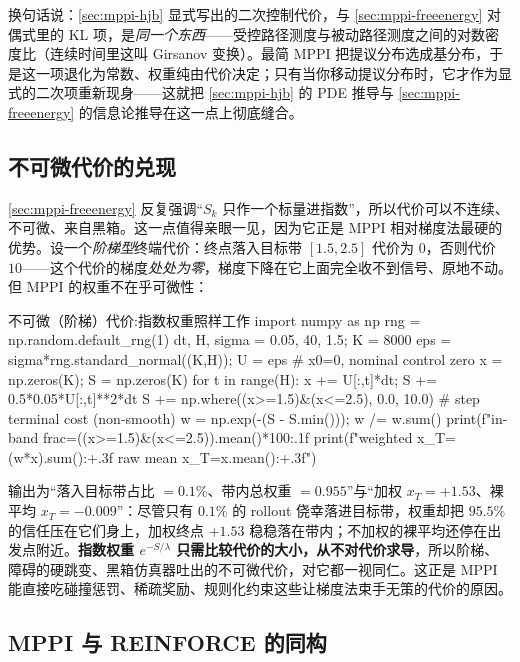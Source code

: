 \noindent 换句话说：\cref{sec:mppi-hjb} 显式写出的二次控制代价，与 \cref{sec:mppi-freeenergy} 对偶式里的 KL 项，是\emph{同一个东西}——受控路径测度与被动路径测度之间的对数密度比（连续时间里这叫 Girsanov 变换）。最简 MPPI 把提议分布选成基分布，于是这一项退化为常数、权重纯由代价决定；只有当你移动提议分布时，它才作为显式的二次项重新现身——这就把 \cref{sec:mppi-hjb} 的 PDE 推导与 \cref{sec:mppi-freeenergy} 的信息论推导在这一点上彻底缝合。

\subsection{不可微代价的兑现}
\label{sec:mppi-nondiff}

\cref{sec:mppi-freeenergy} 反复强调“$S_k$ 只作一个标量进指数”，所以代价可以不连续、不可微、来自黑箱。这一点值得亲眼一见，因为它正是 MPPI 相对梯度法最硬的优势。设一个\emph{阶梯型}终端代价：终点落入目标带 $[1.5,2.5]$ 代价为 $0$，否则代价 $10$——这个代价的梯度\emph{处处为零}，梯度下降在它上面完全收不到信号、原地不动。但 MPPI 的权重不在乎可微性：

\begin{codebox}[Python]{不可微（阶梯）代价:指数权重照样工作}
import numpy as np
rng = np.random.default_rng(1)
dt, H, sigma = 0.05, 40, 1.5; K = 8000
eps = sigma*rng.standard_normal((K,H)); U = eps          # x0=0, nominal control zero
x = np.zeros(K); S = np.zeros(K)
for t in range(H):
    x += U[:,t]*dt; S += 0.5*0.05*U[:,t]**2*dt
S += np.where((x>=1.5)&(x<=2.5), 0.0, 10.0)              # step terminal cost (non-smooth)
w = np.exp(-(S - S.min())); w /= w.sum()
print(f"in-band frac={((x>=1.5)&(x<=2.5)).mean()*100:.1f}%
print(f"weighted x_T={(w*x).sum():+.3f}   raw mean x_T={x.mean():+.3f}")
\end{codebox}

\noindent 输出为“落入目标带占比 $=0.1\%$、带内总权重 $=0.955$”与“加权 $x_T=+1.53$、裸平均 $x_T=-0.009$”：尽管只有 $0.1\%$ 的 rollout 侥幸落进目标带，权重却把 $95.5\%$ 的信任压在它们身上，加权终点 $+1.53$ 稳稳落在带内；不加权的裸平均还停在出发点附近。\textbf{指数权重 $e^{-S/\lambda}$ 只需比较代价的大小，从不对代价求导}，所以阶梯、障碍的硬跳变、黑箱仿真器吐出的不可微代价，对它都一视同仁。这正是 MPPI 能直接吃碰撞惩罚、稀疏奖励、规则化约束这些让梯度法束手无策的代价的原因。

\subsection{MPPI 与 REINFORCE 的同构}
\label{sec:mppi-reinforce}

